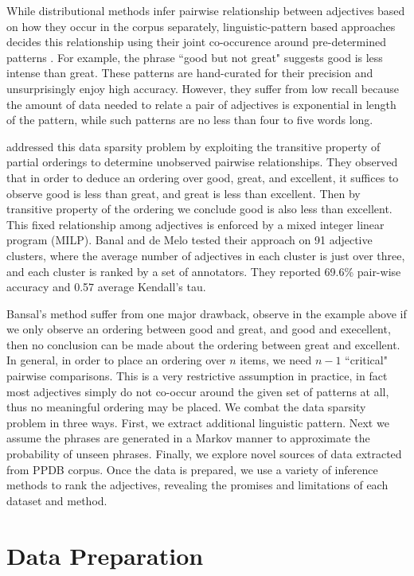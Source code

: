 \documentclass[11pt,letterpaper]{article}
\begin{document}
While distributional methods infer pairwise relationship between adjectives based on how they occur in the corpus separately, linguistic-pattern based approaches decides this relationship using their joint co-occurence around pre-determined patterns \cite{sheinman2009adjscales,schulam2010automatically,sheinman2012refining} . For example, the phrase ``good but not great" suggests good is less intense than great. These patterns are hand-curated for their precision and unsurprisingly enjoy high accuracy. However, they suffer from low recall because the amount of data needed to relate a pair of adjectives is exponential in length of the pattern, while such patterns are no less than four to five words long.

 addressed this data sparsity problem by exploiting the transitive property of partial orderings to determine unobserved pairwise relationships. They observed that in order to deduce an ordering over good, great, and excellent, it suffices to observe good is less than great, and great is less than excellent. Then by transitive property of the ordering we conclude good is also less than excellent. This fixed relationship among adjectives is enforced by a mixed integer linear program (MILP). Banal and de Melo tested their approach on 91 adjective clusters, where the average number of adjectives in each cluster is just over three, and each cluster is ranked by a set of annotators. They reported 69.6\% pair-wise accuracy and 0.57 average Kendall's tau. 

Bansal's method suffer from one major drawback, observe in the example above if we only observe an ordering between good and great, and good and execellent, then no conclusion can be made about the ordering between great and excellent. In general, in order to place an ordering over $n$ items, we need $n - 1$ ``critical" pairwise comparisons. This is a very restrictive assumption in practice, in fact most adjectives simply do not co-occur around the given set of patterns at all, thus no meaningful ordering may be placed. We combat the data sparsity problem in three ways. First, we extract additional linguistic pattern. Next we assume the phrases are generated in a Markov manner to approximate the probability of unseen phrases. Finally, we explore novel sources of data extracted from PPDB corpus. Once the data is prepared, we use a variety of inference methods to rank the adjectives, revealing the promises and limitations of each dataset and method.

\section{Data Preparation}
\end{document}
